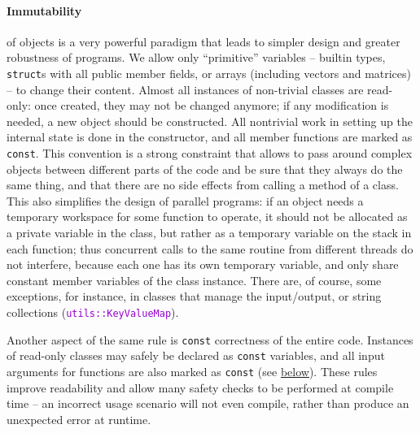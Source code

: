 \documentclass[12pt]{article}
\newcommand{\ttt}[1]{\textcolor{darkviolet}{\texttt{#1}}}
\begin{document}
\paragraph{Immutability} \label{sec:Const}  of objects is a very powerful paradigm that leads to simpler design and greater robustness of programs. We allow only ``primitive'' variables -- builtin types, \texttt{struct}s with all public member fields, or arrays (including vectors and matrices) -- to change their content. Almost all instances of non-trivial classes are read-only: once created, they may not be changed anymore; if any modification is needed, a new object should be constructed. All nontrivial work in setting up the internal state is done in the constructor, and all member functions are marked as \texttt{const}. This convention is a strong constraint that allows to pass around complex objects between different parts of the code and be sure that they always do the same thing, and that there are no side effects from calling a method of a class. This also simplifies the design of parallel programs: if an object needs a temporary workspace for some function to operate, it should not be allocated as a private variable in the class, but rather as a temporary variable on the stack in each function; thus concurrent calls to the same routine from different threads do not interfere, because each one has its own temporary variable, and only share constant member variables of the class instance.
There are, of course, some exceptions, for instance, in classes that manage the input/output, or string collections (\ttt{utils::KeyValueMap}).

Another aspect of the same rule is \texttt{const} correctness of the entire code. Instances of read-only classes may safely be declared as \texttt{const} variables, and all input arguments for functions are also marked as \texttt{const} (see \hyperref[sec:CallingConventions]{below}).
These rules improve readability and allow many safety checks to be performed at compile time -- an incorrect usage scenario will not even compile, rather than produce an unexpected error at runtime.
\end{document}

